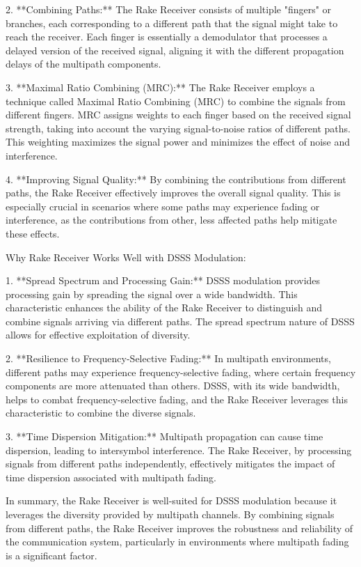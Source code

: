 \documentclass[colorlinks,11pt,a4paper,normalphoto,withhyper,ragged2e]{altareport}
\begin{document}
				2. **Combining Paths:**
				The Rake Receiver consists of multiple "fingers" or branches, each corresponding to a different path that the signal might take to reach the receiver. Each finger is essentially a demodulator that processes a delayed version of the received signal, aligning it with the different propagation delays of the multipath components.
				
				3. **Maximal Ratio Combining (MRC):**
				The Rake Receiver employs a technique called Maximal Ratio Combining (MRC) to combine the signals from different fingers. MRC assigns weights to each finger based on the received signal strength, taking into account the varying signal-to-noise ratios of different paths. This weighting maximizes the signal power and minimizes the effect of noise and interference.
				
				4. **Improving Signal Quality:**
				By combining the contributions from different paths, the Rake Receiver effectively improves the overall signal quality. This is especially crucial in scenarios where some paths may experience fading or interference, as the contributions from other, less affected paths help mitigate these effects.
				
				Why Rake Receiver Works Well with DSSS Modulation:
				
				1. **Spread Spectrum and Processing Gain:**
				DSSS modulation provides processing gain by spreading the signal over a wide bandwidth. This characteristic enhances the ability of the Rake Receiver to distinguish and combine signals arriving via different paths. The spread spectrum nature of DSSS allows for effective exploitation of diversity.
				
				2. **Resilience to Frequency-Selective Fading:**
				In multipath environments, different paths may experience frequency-selective fading, where certain frequency components are more attenuated than others. DSSS, with its wide bandwidth, helps to combat frequency-selective fading, and the Rake Receiver leverages this characteristic to combine the diverse signals.
				
				3. **Time Dispersion Mitigation:**
				Multipath propagation can cause time dispersion, leading to intersymbol interference. The Rake Receiver, by processing signals from different paths independently, effectively mitigates the impact of time dispersion associated with multipath fading.
				
				In summary, the Rake Receiver is well-suited for DSSS modulation because it leverages the diversity provided by multipath channels. By combining signals from different paths, the Rake Receiver improves the robustness and reliability of the communication system, particularly in environments where multipath fading is a significant factor.
				
\end{document}
